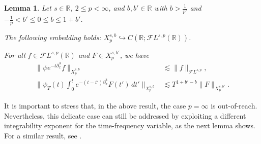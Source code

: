 \documentclass[%
11pt,  reqno]{amsart}
\newcommand{\5}{\textup{V}}
\newcommand{\noi}{\noindent}
\newcommand{\FL}{\mathcal{F} L}
\newcommand{\les}{\lesssim}
\newcommand{\dx}{\partial_x}
\newtheorem{lemma}[theorem]{Lemma}
\theoremstyle{remark}
\newcommand{\R}{\mathbb{R}}
\numberwithin{equation}{section}
\numberwithin{theorem}{section}
\begin{document}
        
        
\begin{lemma}
\label{lem:linear_estimates_qfinite}
			Let $s\in\R$, $2\le p <\infty$, and $b,b'\in\R$ with $b > \frac{1}{p'}$ and $-\frac1p<b' \le 0 \le b \le 1+b'$. 

			\noi{\rm(i)} The following embedding holds: $X^{s,b}_{p} \hookrightarrow C(\R;\FL^{s,p}(\R))$. 
            
			\smallskip
			\noi{\rm(ii)} For all $f \in \FL^{s,p}(\R)$ and $F \in X^{s, b'}_p$, we have
			\begin{align}
				\label{lin1_gh}
				\| \psi e^{-t\dx^3} f \|_{X^{s,b}_{p}} &\les \| f \|_{\FL^{s,p}}, 
                \\
				\bigg\| \psi_T (t) \int_0^t e^{-(t-t')\dx^3 } F(t') \, dt' \bigg\|_{X^{s,b}_{p} } 
                &
                \les T^{1+b'-b} \| F \|_{X^{s,b'}_{p}}.
                \label{lin2a_gh}
			\end{align}
			
		\end{lemma}

        
		It is important to stress that, in the above result, the case $p=\infty$ is out-of-reach. Nevertheless, this delicate case can still be addressed by exploiting a different integrability exponent for the time-frequency variable, as the next lemma shows. For a similar result, see \cite[Section 7]{CC24}. 
		
\end{document}
